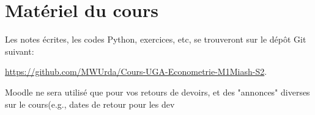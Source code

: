 \documentclass[10pt, reqno]{amsart}
\begin{document}
\section{Matériel du cours}

Les notes écrites, les codes Python, exercices, etc, se trouveront sur le dépôt Git suivant:

\url{https://github.com/MWUrda/Cours-UGA-Econometrie-M1Miash-S2}.

Moodle ne sera utilisé que pour vos retours de devoirs, et des "annonces" diverses sur le cours(e.g., dates de retour pour les dev


 
\end{document}
